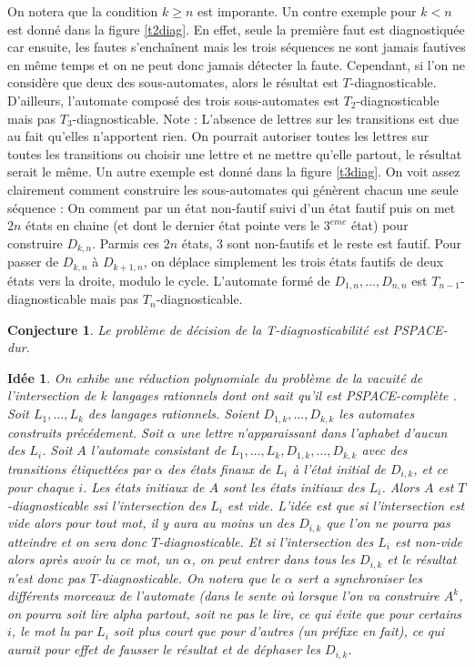 \documentclass[conference]{IEEEtran}
\newtheorem{myconj}{Conjecture}
\newtheorem{myid}{Idée}
\begin{document}
On notera que la condition $k\ge n$ est imporante. Un contre exemple pour $k<n$ est donné dans la figure \ref{t2diag}. En effet, seule la première faut est diagnostiquée car ensuite, les fautes s'enchaînent mais les trois séquences ne sont jamais fautives en même temps et on ne peut donc jamais détecter la faute. Cependant, si l'on ne considère que deux des sous-automates, alors le résultat est $T$-diagnosticable. D'ailleurs, l'automate composé des trois sous-automates est $T_2$-diagnosticable mais pas $T_3$-diagnosticable. Note : L'absence de lettres sur les transitions est due au fait qu'elles n'apportent rien. On pourrait autoriser toutes les lettres sur toutes les transitions ou choisir une lettre et ne mettre qu'elle partout, le résultat serait le même. Un autre exemple est donné dans la figure \ref{t3diag}. On voit assez clairement comment construire les sous-automates qui génèrent chacun une seule séquence : On comment par un état non-fautif suivi d'un état fautif puis on met $2n$ états en chaine (et dont le dernier état pointe vers le $3^{eme}$ état) pour construire $D_{k,n}$. Parmis ces $2n$ états, $3$ sont non-fautifs et le reste est fautif. Pour passer de $D_{k,n}$ à $D_{k+1,n}$, on déplace simplement les trois états fautifs de deux états vers la droite, modulo le cycle. L'automate formé de $D_{1,n},\dots,D_{n,n}$ est $T_{n-1}$-diagnosticable mais pas $T_n$-diagnosticable.

\begin{myconj}
Le problème de décision de la T-diagnosticabilité est PSPACE-dur.
\end{myconj}

\begin{myid}
On exhibe une réduction polynomiale du problème de la vacuité de l'intersection de $k$ langages rationnels dont ont sait qu'il est PSPACE-complète \cite{Lange92theemptiness}. Soit $L_1, \dots, L_k$ des langages rationnels. Soient $D_{1,k},\dots, D_{k,k}$ les automates construits précédement. Soit $\alpha$ une lettre n'apparaissant dans l'aphabet d'aucun des $L_i$. Soit $A$ l'automate consistant de $L_1, \dots, L_k, D_{1,k},\dots, D_{k,k}$ avec des transitions étiquettées par $\alpha$ des états finaux de $L_i$ à l'état initial de $D_{i,k}$, et ce pour chaque $i$. Les états initiaux de $A$ sont les états initiaux des $L_i$. Alors $A$ est $T$-diagnosticable ssi l'intersection des $L_i$ est vide. L'idée est que si l'intersection est vide alors pour tout mot, il y aura au moins un des $D_{i,k}$ que l'on ne pourra pas atteindre et on sera donc $T$-diagnosticable. Et si l'intersection des $L_i$ est non-vide alors après avoir lu ce mot, un $\alpha$, on peut entrer dans tous les $D_{i,k}$ et le résultat n'est donc pas $T$-diagnosticable. On notera que le $\alpha$ sert a synchroniser les différents morceaux de l'automate (dans le sente où lorsque l'on va construire $A^k$, on pourra soit lire alpha partout, soit ne pas le lire, ce qui évite que pour certains $i$, le mot lu par $L_i$ soit plus court que pour d'autres (un préfixe en fait), ce qui aurait pour effet de fausser le résultat et de déphaser les $D_{i,k}$.
\end{myid}
\end{document}
